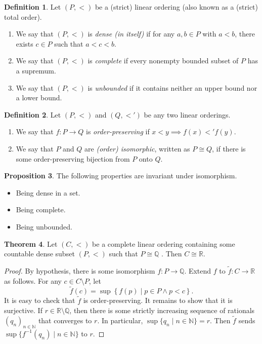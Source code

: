 \documentclass[10pt,letterpaper,cm]{nupset}
\theoremstyle{definition}
\newtheorem{definition}{Definition}[subsection]
\theoremstyle{theorem}
\newtheorem{theorem}[definition]{Theorem}
\newtheorem{prop}[definition]{Proposition}
\theoremstyle{remark}
\newcommand{\N}{\mathbb N}
\newcommand{\Q}{\mathbb Q}
\newcommand{\R}{\mathbb R}
\newcommand{\1}{\mathbf{1}}
\newcommand{\0}{\vec 0}
\begin{document}
\begin{definition} Let  $(P, <)$ be a (strict) linear ordering (also known as a (strict) total order).
\begin{enumerate}
\item We say that $(P, <)$  is \textit{dense (in itself)} if for any $a, b \in P$ with $a<b$, there exists   $c\in P$ such that $a<c<b$. 
\item We say that $(P, <)$ is \textit{complete} if every nonempty bounded subset of $P$ has a supremum. 
\item We say that $(P, <)$ is \textit{unbounded} if it contains neither an upper bound nor a lower bound. 
\end{enumerate}
\end{definition}

\begin{definition}
Let $(P, <)$ and $(Q, <')$ be any two linear orderings. 
\begin{enumerate}
\item We say that $f : P \to Q$ is \textit{order-preserving} if $x< y \implies f(x) <' f(y)$.
\item We say that $P$ and $Q$ are \textit{(order) isomorphic}, written as $P\cong Q$, if there is some order-preserving bijection from $P$ onto $Q$.
\end{enumerate}
\end{definition}

\begin{prop}
The following  properties are invariant under isomorphism.
\begin{itemize}
\item Being dense in a set.
\item Being complete.
\item Being unbounded. 
\end{itemize}
\end{prop}

\begin{theorem}
 Let $(C, <)$ be a complete linear ordering  containing some countable dense subset $(P, <)$ such that $P \cong \Q$ . Then $C\cong \R$. 
\end{theorem}
\begin{proof} 
 By hypothesis, there is some isomorphism $f: P \to \Q$. Extend $f$ to $\tilde{f} : C \to \R$ as follows. For any $c \in C \setminus P$, let $$\tilde{f}(c)  = \sup\left\{f(p) \mid p\in P \land p < c\right\}.$$ It is easy to check that $\tilde{f}$ is order-preserving. It remains to show that it is surjective. If $r\in \R \setminus \Q$, then there is some strictly increasing sequence of rationals $(q_n)_{n\in \N}$ that converges to $r$. In particular, $\sup\{q_n \mid n\in \N\}  = r$. Then $\tilde{f}$ sends $\sup\{f^{-1}(q_n) \mid n \in \N\}$ to $r$.
\end{proof}
\end{document}
